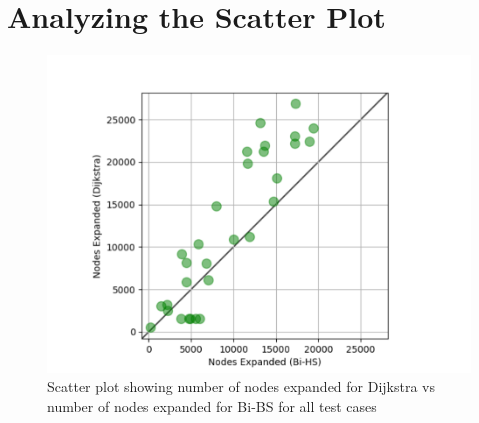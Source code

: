 \documentclass[8pt, letterpaper, titlepage]{article}
\title{\textbf{\Huge{ 
\begin{center}
MATE 201\\ \large{Class notes} %
\end{center} 
}}}
\author{Lora Ma}
\begin{document}
\section*{Analyzing the Scatter Plot}
\begin{figure}[H]
  \begin{center}    
    \includegraphics[width=\linewidth*3/6]{image.png}
    \caption{Scatter plot showing number of nodes expanded for Dijkstra vs number of nodes expanded for Bi-BS for all test cases}
  \end{center}
\end{figure}
\end{document}
